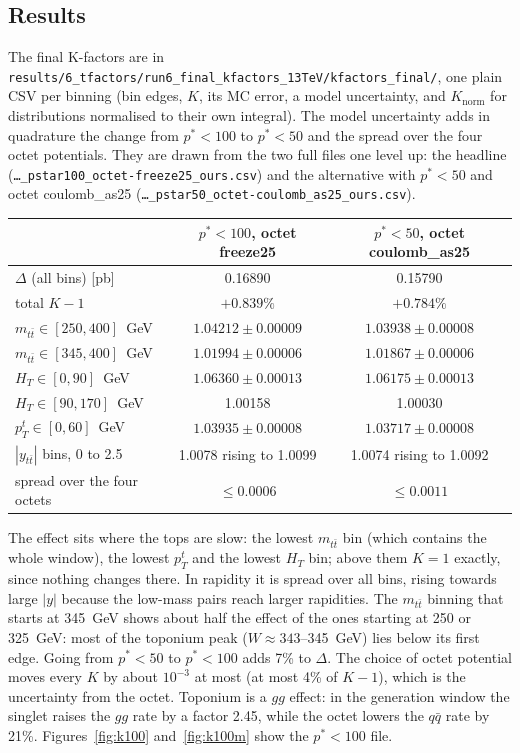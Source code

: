 \documentclass[11pt]{article}
\newcommand{\code}[1]{\texttt{#1}}
\begin{document}
\subsection{Results}
{\sloppy The final K-factors are in \code{results/6\_tfactors/run6\_final\_kfactors\_13TeV/kfactors\_final/}, one plain CSV per
binning (bin edges, $K$, its MC error, a model uncertainty, and $K_\mathrm{norm}$ for distributions normalised to their own
integral). The model uncertainty adds in quadrature the change from $p^*<100$ to $p^*<50$ and the spread over the four octet
potentials. They are drawn from the two full files one level up: the headline (\code{\ldots\_pstar100\_octet-freeze25\_ours.csv})
and the alternative with $p^*<50$ and octet coulomb\_as25 (\code{\ldots\_pstar50\_octet-coulomb\_as25\_ours.csv}).\par}

\begin{center}\small
\begin{tabular}{@{}lcc@{}}
\toprule
 & $p^*<100$, octet freeze25 & $p^*<50$, octet coulomb\_as25\\
\midrule
$\Delta$ (all bins) [pb] & 0.16890 & 0.15790\\
total $K-1$ & $+0.839\%$ & $+0.784\%$\\
$m_{t\bar t}\in[250,400]$~GeV & $1.04212\pm0.00009$ & $1.03938\pm0.00008$\\
$m_{t\bar t}\in[345,400]$~GeV & $1.01994\pm0.00006$ & $1.01867\pm0.00006$\\
$H_T\in[0,90]$~GeV & $1.06360\pm0.00013$ & $1.06175\pm0.00013$\\
$H_T\in[90,170]$~GeV & 1.00158 & 1.00030\\
$p_T^t\in[0,60]$~GeV & $1.03935\pm0.00008$ & $1.03717\pm0.00008$\\
$|y_{t\bar t}|$ bins, 0 to 2.5 & 1.0078 rising to 1.0099 & 1.0074 rising to 1.0092\\
\midrule
spread over the four octets & $\le0.0006$ & $\le0.0011$\\
\bottomrule
\end{tabular}
\end{center}

The effect sits where the tops are slow: the lowest $m_{t\bar t}$ bin (which contains the whole window), the lowest $p_T^t$ and the
lowest $H_T$ bin; above them $K=1$ exactly, since nothing changes there. In rapidity it is spread over all bins, rising towards
large $|y|$ because the low-mass pairs reach larger rapidities. The $m_{t\bar t}$ binning that starts at 345~GeV shows about half the
effect of the ones starting at 250 or 325~GeV: most of the toponium peak ($W\approx343$--345~GeV) lies below its first edge. Going
from $p^*<50$ to $p^*<100$ adds 7\% to $\Delta$. The choice of octet potential moves every $K$ by about $10^{-3}$ at most (at most
4\% of $K-1$), which is the uncertainty from the octet. Toponium is a $gg$ effect: in the generation window the singlet raises
the $gg$ rate by a factor 2.45, while the octet lowers the $q\bar q$ rate by 21\%. Figures~\ref{fig:k100} and~\ref{fig:k100m} show the $p^*<100$ file.
\end{document}
